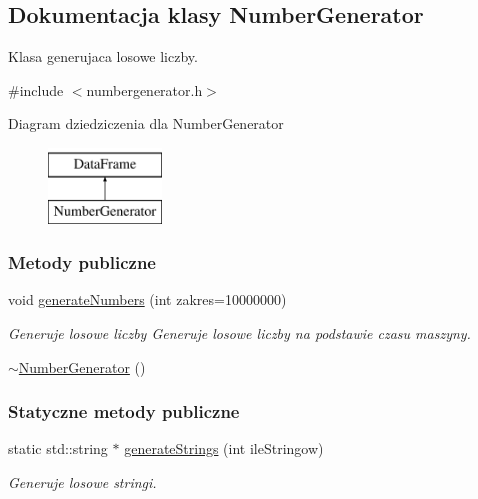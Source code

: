 \hypertarget{class_number_generator}{\subsection{Dokumentacja klasy Number\-Generator}
\label{class_number_generator}
}


Klasa generujaca losowe liczby.  




{\ttfamily \#include $<$numbergenerator.\-h$>$}

Diagram dziedziczenia dla Number\-Generator\begin{figure}[H]
\begin{center}
\leavevmode
\includegraphics[height=2.000000cm]{class_number_generator}
\end{center}
\end{figure}
\subsubsection*{Metody publiczne}
\begin{DoxyCompactItemize}
\item 
void \hyperlink{class_number_generator_a511673bb245d14a048702558d12deb63}{generate\-Numbers} (int zakres=10000000)
\begin{DoxyCompactList}\small\item\em Generuje losowe liczby Generuje losowe liczby na podstawie czasu maszyny. \end{DoxyCompactList}\item 
\hyperlink{class_number_generator_a828757cc2c9712e0b111584d1f1d5164}{$\sim$\-Number\-Generator} ()
\end{DoxyCompactItemize}
\subsubsection*{Statyczne metody publiczne}
\begin{DoxyCompactItemize}
\item 
static std\-::string $\ast$ \hyperlink{class_number_generator_af434d1cd0b338d22b11b24fbd2e14dce}{generate\-Strings} (int ile\-Stringow)
\begin{DoxyCompactList}\small\item\em Generuje losowe stringi. \end{DoxyCompactList}\end{DoxyCompactItemize}
